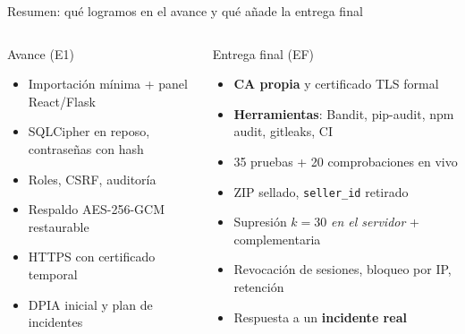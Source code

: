 \documentclass[aspectratio=169,11pt]{beamer}
\begin{document}
\begin{frame}{Resumen: qué logramos en el avance y qué añade la entrega final}
\small
\begin{columns}[T,onlytextwidth]
\begin{block}{Avance (E1)}
\begin{itemize}\setlength\itemsep{1pt}
\item Importación mínima + panel React/Flask
\item SQLCipher en reposo, contraseñas con hash
\item Roles, CSRF, auditoría
\item Respaldo AES-256-GCM restaurable
\item HTTPS con certificado temporal
\item DPIA inicial y plan de incidentes
\end{itemize}
\end{block}
\begin{block}{Entrega final (EF)}
\begin{itemize}\setlength\itemsep{1pt}
\item \textbf{CA propia} y certificado TLS formal
\item \textbf{Herramientas}: Bandit, pip-audit, npm audit, gitleaks, CI
\item 35 pruebas + 20 comprobaciones en vivo
\item ZIP sellado, \texttt{seller\_id} retirado
\item Supresión $k{=}30$ \emph{en el servidor} + complementaria
\item Revocación de sesiones, bloqueo por IP, retención
\item Respuesta a un \textbf{incidente real}
\end{itemize}
\end{block}
\end{columns}
\end{frame}
\end{document}
